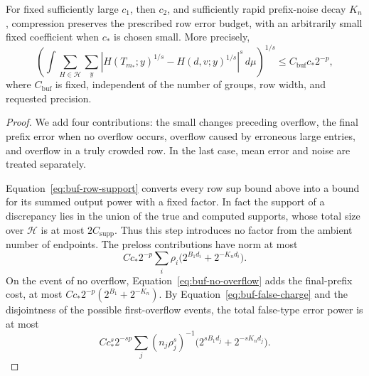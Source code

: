 \begin{proposition}
\label{prop:buf-error}
For fixed sufficiently large $c_1$, then $c_2$, and sufficiently rapid
prefix-noise decay $K_n$, compression preserves the prescribed row error
budget, with an arbitrarily small fixed coefficient when $c_*$ is chosen
small.  More precisely,
\begin{equation}
 \left(\int\sum_{H\in\mathcal H}\sum_y
  |H(T_{m_*};y)^{1/s}-H(d,v;y)^{1/s}|^s\,d\mu\right)^{1/s}
       \leq C_{\mathrm{buf}}c_*2^{-p},
 \label{eq:buf-integrated}
\end{equation}
where $C_{\mathrm{buf}}$ is fixed, independent of the number of groups,
row width, and requested precision.
\end{proposition}
\begin{proof}
We add four contributions: the small changes preceding overflow, the final prefix error when no overflow occurs, overflow caused by erroneous large entries, and overflow in a truly crowded row. In the last case, mean error and noise are treated separately.

Equation~\eqref{eq:buf-row-support} converts every row sup bound above
into a bound for its summed output power with a fixed factor.
In fact the support of a discrepancy lies in the union of the true and
computed supports, whose total size over $\mathcal H$ is at most
$2C_{\mathrm{supp}}$.  Thus this step introduces no factor from the
ambient number of endpoints.
The preloss contributions have norm at most
\[
 Cc_*2^{-p}\sum_i\rho_i
             \bigl(2^{B_1d_i}+2^{-K_nd_i}\bigr).
\]
On the event of no overflow, Equation~\eqref{eq:buf-no-overflow} adds the
final-prefix cost, at most $Cc_*2^{-p}(2^{B_1}+2^{-K_n})$.
By Equation~\eqref{eq:buf-false-charge} and the disjointness of the
possible first-overflow events, the total false-type error power is at
most
\begin{equation}
 Cc_*^s2^{-sp}\sum_j
       (n_j\rho_j^s)^{-1}
       \bigl(2^{sB_1d_j}+2^{-sK_nd_j}\bigr).
 \label{eq:buf-false-sum}
\end{equation}


\end{proof}
